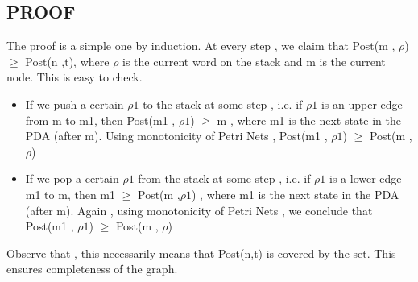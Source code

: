 \documentclass[a4paper,10pt]{article}
\begin{document}
\subsection{PROOF}
  The proof is a simple one by induction. At every step , we claim that Post(m , $\rho$) $\geqslant$ Post(n ,t), where $\rho$ is the current word on the stack and m is the current node. 
  \newline
  This is easy to check.
  \begin{itemize}
    \item 
 If we push a certain $\rho1$ to the stack at some step , i.e.  if $\rho1$ is an upper edge from m to m1, 
  then Post(m1 , $\rho1$) $\geqslant$ m , where m1 is the next state in the PDA (after m). Using monotonicity of Petri Nets , Post(m1 , $\rho1$)  $\geqslant$  Post(m , $\rho$) 
  \item
  If we pop a certain $\rho1$ from the stack at some step , i.e.  if $\rho1$ is a lower edge m1 to m, 
  then m1  $\geqslant$ Post(m ,$\rho1$) , where m1 is the next state in the PDA (after m). Again , using monotonicity of Petri Nets , we conclude that Post(m1 , $\rho1$)  $\geqslant$  Post(m , $\rho$)
   \end{itemize}
   
  Observe that , this necessarily means that Post(n,t) is covered by the set. This ensures completeness of the graph. 
   
   
     
\end{document}
